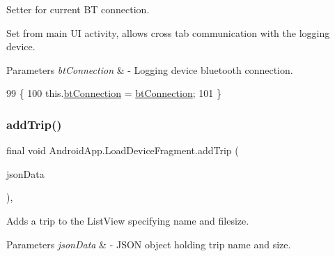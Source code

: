 Setter for current BT connection. 

Set from main UI activity, allows cross tab communication with the logging device.


\begin{DoxyParams}{Parameters}
{\em bt\+Connection} & -\/ Logging device bluetooth connection. \\
\hline
\end{DoxyParams}

\begin{DoxyCode}
99                                                            \{
100         this.\hyperlink{class_android_app_1_1_load_device_fragment_a245147c7d3683cf1556680a382f328a9}{btConnection} = \hyperlink{class_android_app_1_1_load_device_fragment_a245147c7d3683cf1556680a382f328a9}{btConnection};
101     \}
\end{DoxyCode}
\mbox{\label{class_android_app_1_1_load_device_fragment_a182949dc35ed68974acf64e20cdc6f20}} 
\subsubsection{\texorpdfstring{add\+Trip()}{addTrip()}}
{\footnotesize\ttfamily final void Android\+App.\+Load\+Device\+Fragment.\+add\+Trip (\begin{DoxyParamCaption}\item[{J\+S\+O\+N\+Object}]{json\+Data }\end{DoxyParamCaption})\hspace{0.3cm}{\ttfamily [inline]}, {\ttfamily [private]}}



Adds a trip to the List\+View specifying name and filesize. 


\begin{DoxyParams}{Parameters}
{\em json\+Data} & -\/ J\+S\+ON object holding trip name and size. \\
\hline
\end{DoxyParams}

